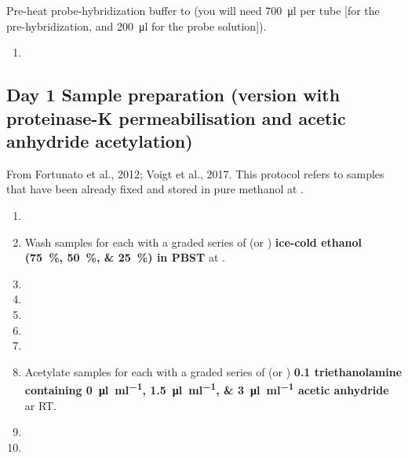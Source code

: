 \documentclass[10pt]{report}
\begin{document}
\bigskip\alert{Pre-heat probe-hybridization buffer to \thirtysevendegree{} (you will need \qty{700}{\ul} per tube [\fivehunmicrol for the pre-hybridization, and \qty{200}{\ul} for the probe solution]).}

\begin{enumerate}[resume = steps]
	\item {}
\end{enumerate}

\subsection*{Day 1 \textendash{} Sample preparation (version with proteinase-K permeabilisation and acetic anhydride acetylation)}

\alert{From Fortunato et al., 2012; Voigt et al., 2017.}
\alert{This protocol refers to samples that have been already fixed and stored in pure methanol at \minustwenty.}

\begin{enumerate}[series = steps]
	\item {}
	\item Wash samples for \underline{\quarter} each with a graded series of \fivehunmicrol{} (or \onemil) \textbf{ice-cold ethanol (\qtylist{75;50;25}{\percent}) in PBST} at \fourdegree.
	\item {}
	\item {}
	\item {}
	\item {}
	\item {}
	\item Acetylate samples for \underline{\quarter} each with a graded series of \fivehunmicrol{} (or \onemil) \textbf{\qty{0.1}{\molar} triethanolamine containing \qtylist{0;1.5;3}{\ul\per\ml} acetic anhydride} ar RT.
	\item {}
	\item {}
\end{enumerate}
\end{document}
